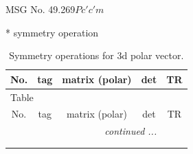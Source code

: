 \documentclass[fleqn,8pt]{jsarticle}
\begin{document}
\setcounter{MaxMatrixCols}{32}

\renewcommand{\tablename}{Table~}
\renewcommand{\figurename}{Figure~}
\begin{center}
\LARGE
MSG No. 49.269\quad$Pc'c'm$
\end{center}
* symmetry operation
\renewcommand{\arraystretch}{1.3}
\begin{longtable}{ccccc}
\caption{Symmetry operations for 3d polar vector.}
 \\
 \hline \hline
No. & tag & matrix (polar) & det & TR \\ \hline \endfirsthead

\multicolumn{4}{l}{\tablename\ \thetable{}} \\
 \hline \hline
No. & tag & matrix (polar) & det & TR \\ \hline \endhead

 \hline \hline
\multicolumn{4}{r}{\footnotesize\it continued ...} \\ \endfoot

 \hline \hline
\multicolumn{4}{r}{} \\ \endlastfoot


\end{longtable}
\end{document}
